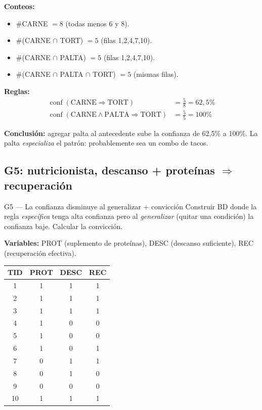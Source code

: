 \documentclass[11pt,a4paper]{article}
\newcommand{\conf}{\operatorname{conf}}
\begin{document}
\textbf{Conteos:}
\begin{itemize}
    \item $\#$CARNE $= 8$ (todas menos 6 y 8).
    \item $\#$(CARNE $\cap$ TORT) $= 5$ (filas 1,2,4,7,10).
    \item $\#$(CARNE $\cap$ PALTA) $= 5$ (filas 1,2,4,7,10).
    \item $\#$(CARNE $\cap$ PALTA $\cap$ TORT) $= 5$ (mismas filas).
\end{itemize}

\textbf{Reglas:}
\begin{align*}
\conf(\text{CARNE} \Rightarrow \text{TORT}) &= \frac{5}{8} = 62{,}5\% \\
\conf(\text{CARNE} \wedge \text{PALTA} \Rightarrow \text{TORT}) &= \frac{5}{5} = 100\%
\end{align*}

\textbf{Conclusión:} agregar palta al antecedente sube la confianza de 62{,}5\% a 100\%.
La palta \emph{especializa} el patrón: probablemente sea un combo de tacos.

\subsection{G5: nutricionista, descanso + proteínas $\Rightarrow$ recuperación}

\begin{ejerciciobox}{G5 — La confianza disminuye al generalizar + convicción}
Construir BD donde la regla \emph{específica} tenga alta confianza pero al
\emph{generalizar} (quitar una condición) la confianza baje. Calcular la convicción.
\end{ejerciciobox}

\textbf{Variables:} PROT (suplemento de proteínas), DESC (descanso suficiente), REC (recuperación efectiva).

\begin{center}
\begin{tabular}{@{}cccc@{}}
\toprule
TID & PROT & DESC & REC \\
\midrule
1 & 1 & 1 & 1 \\
2 & 1 & 1 & 1 \\
3 & 1 & 1 & 1 \\
4 & 1 & 0 & 0 \\
5 & 1 & 0 & 0 \\
6 & 1 & 0 & 1 \\
7 & 0 & 1 & 1 \\
8 & 0 & 1 & 0 \\
9 & 0 & 0 & 0 \\
10& 1 & 1 & 1 \\
\bottomrule
\end{tabular}
\end{center}
\end{document}
